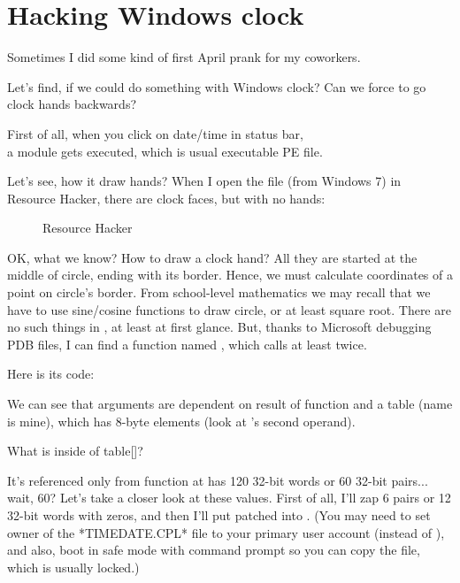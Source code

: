 \section{Hacking Windows clock}

Sometimes I did some kind of first April prank for my coworkers.

Let's find, if we could do something with Windows clock?
Can we force to go clock hands backwards?

First of all, when you click on date/time in status bar,\\
a  module gets executed,
which is usual executable PE file.

Let's see, how it draw hands?
When I open the file (from Windows 7) in Resource Hacker, there are clock faces, but with no hands:

\begin{figure}[H]
\centering
{}
\caption{Resource Hacker}
\end{figure}

OK, what we know? How to draw a clock hand? All they are started at the middle of circle, ending with its border.
Hence, we must calculate coordinates of a point on circle's border.
From school-level mathematics we may recall that we have to use sine/cosine functions to draw circle, or at least
square root.
There are no such things in , at least at first glance.
But, thanks to Microsoft debugging PDB files, I can find a function named , which calls
 at least twice.

Here is its code:



We can see that  arguments are dependent on result of  function
and a  table (name is mine),
which has 8-byte elements (look at 's second operand).

What is inside of table[]?



It's referenced only from  function at has 120 32-bit words or 60 32-bit pairs... wait, 60?
Let's take a closer look at these values.
First of all, I'll zap 6 pairs or 12 32-bit words with zeros, and then I'll put patched 
into .
(You may need to set owner of the *TIMEDATE.CPL* file to your primary user account (instead of ),
and also, boot in safe mode with command prompt so you can copy the file, which is usually locked.)

